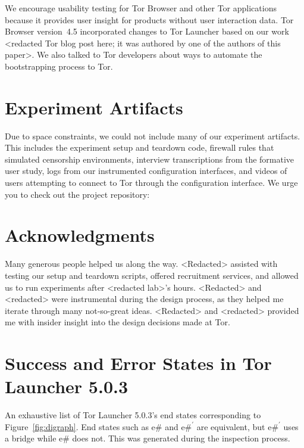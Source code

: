 \documentclass[USenglish,oneside,twocolumn]{article}
\begin{document}
We encourage usability testing for Tor Browser and other Tor applications because it provides user insight for products without user interaction data. Tor Browser version~4.5 incorporated changes to Tor Launcher based on our work <redacted Tor blog post here; it was authored by one of the authors of this paper>. We also talked to Tor developers about ways to automate the bootstrapping process to Tor. 

\section {Experiment Artifacts} 
Due to space constraints, we could not include many of our experiment artifacts. This includes the experiment setup and teardown code, firewall rules that simulated censorship environments, interview transcriptions from the formative user study, logs from our instrumented configuration interfaces, and videos of users attempting to connect to Tor through the configuration interface. We urge you to check out the project repository: \\


\section {Acknowledgments}
Many generous people helped us along the way. <Redacted> assisted with testing our setup and teardown scripts, offered recruitment services, and allowed us to run experiments after <redacted lab>'s hours. <Redacted> and <redacted> were instrumental during the design process, as they helped me iterate through many not-so-great ideas.  <Redacted> and <redacted> provided me with insider insight into the design decisions made at Tor.




\appendix

\section{Success and Error States in Tor Launcher 5.0.3} 
\label{states} 
An exhaustive list of Tor Launcher 5.0.3's end states corresponding to Figure~\ref{fig:digraph}. End states such as e\# and $\mbox{e\#}^\prime$ are equivalent, but $\mbox{e\#}^\prime$ uses a bridge while e\# does not. This was generated during the inspection process.\\
\end{document}
